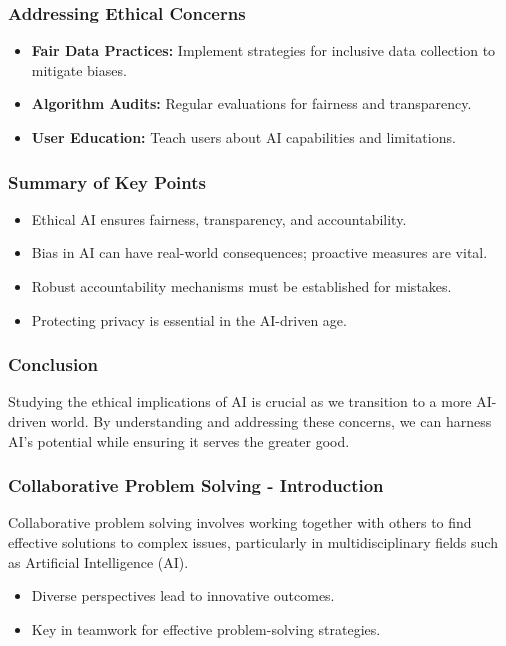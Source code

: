 \documentclass{beamer}
\begin{document}
\begin{frame}[fragile]
    \frametitle{Addressing Ethical Concerns}
    \begin{itemize}
        \item \textbf{Fair Data Practices:} Implement strategies for inclusive data collection to mitigate biases.
        \item \textbf{Algorithm Audits:} Regular evaluations for fairness and transparency.
        \item \textbf{User Education:} Teach users about AI capabilities and limitations.
    \end{itemize}
\end{frame}

\begin{frame}[fragile]
    \frametitle{Summary of Key Points}
    \begin{itemize}
        \item Ethical AI ensures fairness, transparency, and accountability.
        \item Bias in AI can have real-world consequences; proactive measures are vital.
        \item Robust accountability mechanisms must be established for mistakes.
        \item Protecting privacy is essential in the AI-driven age.
    \end{itemize}
\end{frame}

\begin{frame}[fragile]
    \frametitle{Conclusion}
    Studying the ethical implications of AI is crucial as we transition to a more AI-driven world. By understanding and addressing these concerns, we can harness AI's potential while ensuring it serves the greater good.
\end{frame}

\begin{frame}[fragile]
    \frametitle{Collaborative Problem Solving - Introduction}
    Collaborative problem solving involves working together with others to find effective solutions to complex issues, particularly in multidisciplinary fields such as Artificial Intelligence (AI). 
    \begin{itemize}
        \item Diverse perspectives lead to innovative outcomes.
        \item Key in teamwork for effective problem-solving strategies.
    \end{itemize}
\end{frame}
\end{document}
